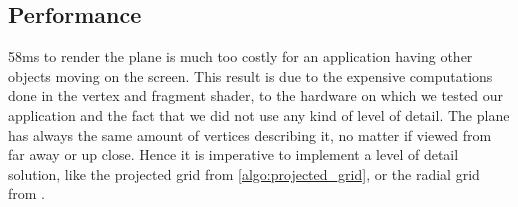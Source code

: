 \subsection{Performance}\label{subsec:performance}

58ms to render the plane is much too costly for an application having other
objects moving on the screen. This result is due to the expensive computations
done in the vertex and fragment shader, to the hardware on which we tested our
application and the fact that we did not use any kind of level of detail. The
plane has always the same amount of vertices describing it, no matter if viewed
from far away or up close. Hence it is imperative to implement a level of detail
solution, like the projected grid from \autoref{algo:projected_grid}, or the
radial grid from \autocite[Chapter~18]{pharr2005gpu}.

